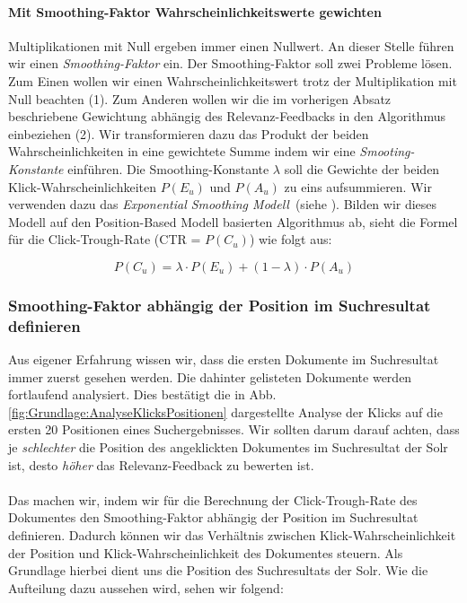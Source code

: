 \paragraph{Mit Smoothing-Faktor Wahrscheinlichkeitswerte gewichten}
Multiplikationen mit Null ergeben immer einen Nullwert. An dieser Stelle führen wir einen \textit{Smoothing-Faktor} ein. Der Smoothing-Faktor soll zwei Probleme lösen. Zum Einen wollen wir einen Wahrscheinlichkeitswert trotz der Multiplikation mit Null beachten (1). Zum Anderen wollen wir die im vorherigen Absatz beschriebene Gewichtung abhängig des Relevanz-Feedbacks in den Algorithmus einbeziehen (2). Wir transformieren dazu das Produkt der beiden Wahrscheinlichkeiten in eine gewichtete Summe indem wir eine \textit{Smooting-Konstante} einführen. Die Smoothing-Konstante $\lambda$ soll die Gewichte der beiden Klick-Wahrscheinlichkeiten $P(E_{u})$ und $P(A_{u})$ zu eins aufsummieren. Wir verwenden dazu das \textit{Exponential Smoothing Modell}~(siehe \cite{ExpSmoothing}). Bilden wir dieses Modell auf den Position-Based Modell basierten Algorithmus ab, sieht die Formel für die Click-Trough-Rate (CTR = $P(C_{u})$) wie folgt aus:
  
\begin{equation}
	P(C_{u}) = \lambda\cdot P(E_{u}) + (1 - \lambda)\cdot P(A_{u})
\end{equation}


\subsubsection{Smoothing-Faktor abhängig der Position im Suchresultat definieren}
\label{sec:Reranking:Methodik:Result-RerankingPBM:VerhaeltnisKlick-Wahrscheinlichkeiten}

Aus eigener Erfahrung wissen wir, dass die ersten Dokumente im Suchresultat immer zuerst gesehen werden. Die dahinter gelisteten Dokumente werden fortlaufend analysiert. Dies bestätigt die in Abb. \ref{fig:Grundlage:AnalyseKlicksPositionen} dargestellte Analyse der Klicks auf die ersten 20 Positionen eines Suchergebnisses. Wir sollten darum darauf achten, dass je \textit{schlechter} die Position des angeklickten Dokumentes im Suchresultat der Solr ist, desto \textit{höher} das Relevanz-Feedback zu bewerten ist. 
\\
\\
Das machen wir, indem wir für die Berechnung der Click-Trough-Rate des Dokumentes den Smoothing-Faktor abhängig der Position im Suchresultat definieren. Dadurch können wir das Verhältnis zwischen Klick-Wahrscheinlichkeit der Position und Klick-Wahrscheinlichkeit des Dokumentes steuern. Als Grundlage hierbei dient uns die Position des Suchresultats der Solr. Wie die Aufteilung dazu aussehen wird, sehen wir folgend:

